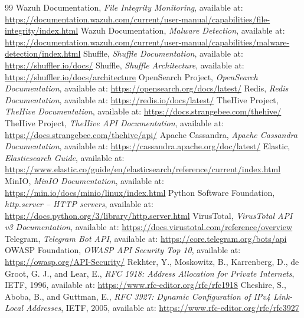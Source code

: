 \begin{thebibliography}{99}
 Wazuh Documentation, \textit{File Integrity Monitoring}, available at: \url{https://documentation.wazuh.com/current/user-manual/capabilities/file-integrity/index.html}
 Wazuh Documentation, \textit{Malware Detection}, available at: \url{https://documentation.wazuh.com/current/user-manual/capabilities/malware-detection/index.html}
 Shuffle, \textit{Shuffle Documentation}, available at: \url{https://shuffler.io/docs/}
 Shuffle, \textit{Shuffle Architecture}, available at: \url{https://shuffler.io/docs/architecture}
 OpenSearch Project, \textit{OpenSearch Documentation}, available at: \url{https://opensearch.org/docs/latest/}
 Redis, \textit{Redis Documentation}, available at: \url{https://redis.io/docs/latest/}
 TheHive Project, \textit{TheHive Documentation}, available at: \url{https://docs.strangebee.com/thehive/}
 TheHive Project, \textit{TheHive API Documentation}, available at: \url{https://docs.strangebee.com/thehive/api/}
 Apache Cassandra, \textit{Apache Cassandra Documentation}, available at: \url{https://cassandra.apache.org/doc/latest/}
 Elastic, \textit{Elasticsearch Guide}, available at: \url{https://www.elastic.co/guide/en/elasticsearch/reference/current/index.html}
 MinIO, \textit{MinIO Documentation}, available at: \url{https://min.io/docs/minio/linux/index.html}
 Python Software Foundation, \textit{http.server -- HTTP servers}, available at: \url{https://docs.python.org/3/library/http.server.html}
 VirusTotal, \textit{VirusTotal API v3 Documentation}, available at: \url{https://docs.virustotal.com/reference/overview}
 Telegram, \textit{Telegram Bot API}, available at: \url{https://core.telegram.org/bots/api}
 OWASP Foundation, \textit{OWASP API Security Top 10}, available at: \url{https://owasp.org/API-Security/}
 Rekhter, Y., Moskowitz, B., Karrenberg, D., de Groot, G. J., and Lear, E., \textit{RFC 1918: Address Allocation for Private Internets}, IETF, 1996, available at: \url{https://www.rfc-editor.org/rfc/rfc1918}
 Cheshire, S., Aboba, B., and Guttman, E., \textit{RFC 3927: Dynamic Configuration of IPv4 Link-Local Addresses}, IETF, 2005, available at: \url{https://www.rfc-editor.org/rfc/rfc3927}

\end{thebibliography}

